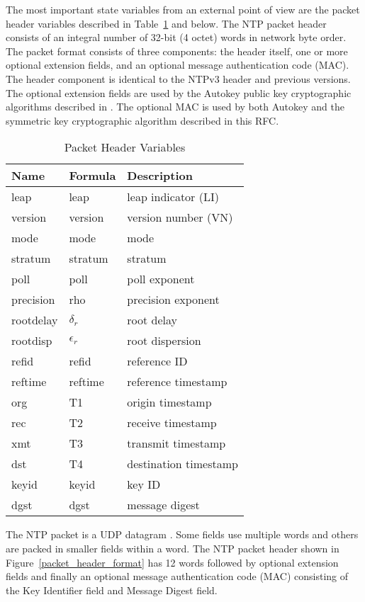 The most important state variables from an external point of view are
the packet header variables described in Table~\ref{packet_header_variables} and below. The NTP
packet header consists of an integral number of 32-bit (4 octet)
words in network byte order. The packet format consists of three
components: the header itself, one or more optional extension fields,
and an optional message authentication code (MAC). The header
component is identical to the NTPv3 header and previous versions.
The optional extension fields are used by the Autokey public key
cryptographic algorithms described in \cite{RFC5906}. The optional MAC is
used by both Autokey and the symmetric key cryptographic algorithm
described in this RFC.

\begin{table}[htb]
\center
\begin{tabular}{| l | l | l |}
\hline
Name & Formula & Description \\
\hline
\hline
leap & leap & leap indicator (LI) \\
version & version & version number (VN) \\
mode & mode & mode \\
stratum & stratum & stratum \\
poll & poll & poll exponent \\
precision & rho & precision exponent \\
rootdelay & $ \delta_r $ & root delay \\
rootdisp & $ \epsilon_r $ & root dispersion \\
refid & refid & reference ID \\
reftime & reftime & reference timestamp \\
org & T1 & origin timestamp \\
rec & T2 & receive timestamp \\
xmt & T3 & transmit timestamp \\
dst & T4 & destination timestamp \\
keyid & keyid & key ID \\
dgst & dgst & message digest \\
\hline
\end{tabular}
\caption{Packet Header Variables}
\label{packet_header_variables}
\end{table}

The NTP packet is a UDP datagram \cite{RFC0768}. Some fields use multiple
words and others are packed in smaller fields within a word. The NTP
packet header shown in Figure~\ref{packet_header_format} has 12 words followed by optional
extension fields and finally an optional message authentication code
(MAC) consisting of the Key Identifier field and Message Digest
field.

